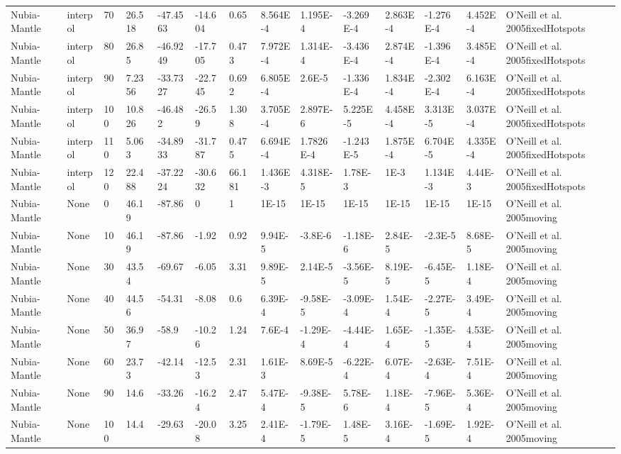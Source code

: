 \begin{landscape}
\begin{longtable}{@{}lllllllllllllp{3.5cm}@{}}
Nubia-Mantle & interpol & 70 & 26.518 & -47.4563 & -14.604 & 0.65 & 8.564E-4 & 1.195E-4 & -3.269E-4 & 2.863E-4 & -1.276E-4 & 4.452E-4 & O'Neill et al. 2005fixedHotspots \\
Nubia-Mantle & interpol & 80 & 26.85 & -46.9249 & -17.705 & 0.473 & 7.972E-4 & 1.314E-4 & -3.436E-4 & 2.874E-4 & -1.396E-4 & 3.485E-4 & O'Neill et al. 2005fixedHotspots \\
Nubia-Mantle & interpol & 90 & 7.2356 & -33.7327 & -22.745 & 0.692 & 6.805E-4 & 2.6E-5 & -1.336E-4 & 1.834E-4 & -2.302E-4 & 6.163E-4 & O'Neill et al. 2005fixedHotspots \\
Nubia-Mantle & interpol & 100 & 10.826 & -46.482 & -26.59 & 1.308 & 3.705E-4 & 2.897E-6 & 5.225E-5 & 4.458E-4 & 3.313E-5 & 3.037E-4 & O'Neill et al. 2005fixedHotspots \\
Nubia-Mantle & interpol & 110 & 5.063 & -34.8933 & -31.787 & 0.475 & 6.694E-4 & 1.7826E-4 & -1.243E-5 & 1.875E-4 & 6.704E-5 & 4.335E-4 & O'Neill et al. 2005fixedHotspots \\
Nubia-Mantle & interpol & 120 & 22.488 & -37.2224 & -30.632 & 66.181 & 1.436E-3 & 4.318E-5 & 1.78E-3 & 1E-3 & 1.134E-3 & 4.44E-3 & O'Neill et al. 2005fixedHotspots \\
Nubia-Mantle & None & 0 & 46.19 & -87.86 & 0 & 1 & 1E-15 & 1E-15 & 1E-15 & 1E-15 & 1E-15 & 1E-15 & O'Neill et al. 2005moving \\
Nubia-Mantle & None & 10 & 46.19 & -87.86 & -1.92 & 0.92 & 9.94E-5 & -3.8E-6 & -1.18E-6 & 2.84E-5 & -2.3E-5 & 8.68E-5 & O'Neill et al. 2005moving \\
Nubia-Mantle & None & 30 & 43.54 & -69.67 & -6.05 & 3.31 & 9.89E-5 & 2.14E-5 & -3.56E-5 & 8.19E-5 & -6.45E-5 & 1.18E-4 & O'Neill et al. 2005moving \\
Nubia-Mantle & None & 40 & 44.56 & -54.31 & -8.08 & 0.6 & 6.39E-4 & -9.58E-5 & -3.09E-4 & 1.54E-4 & -2.27E-5 & 3.49E-4 & O'Neill et al. 2005moving \\
Nubia-Mantle & None & 50 & 36.97 & -58.9 & -10.26 & 1.24 & 7.6E-4 & -1.29E-4 & -4.44E-4 & 1.65E-4 & -1.35E-5 & 4.53E-4 & O'Neill et al. 2005moving \\
Nubia-Mantle & None & 60 & 23.73 & -42.14 & -12.53 & 2.31 & 1.61E-3 & 8.69E-5 & -6.22E-4 & 6.07E-4 & -2.63E-4 & 7.51E-4 & O'Neill et al. 2005moving \\
Nubia-Mantle & None & 90 & 14.6 & -33.26 & -16.24 & 2.47 & 5.47E-4 & -9.38E-5 & 5.78E-6 & 1.18E-4 & -7.96E-5 & 5.36E-4 & O'Neill et al. 2005moving \\
Nubia-Mantle & None & 100 & 14.4 & -29.63 & -20.08 & 3.25 & 2.41E-4 & -1.79E-5 & 1.48E-5 & 3.16E-4 & -1.69E-5 & 1.92E-4 & O'Neill et al. 2005moving \\

\end{longtable}
\end{landscape}

